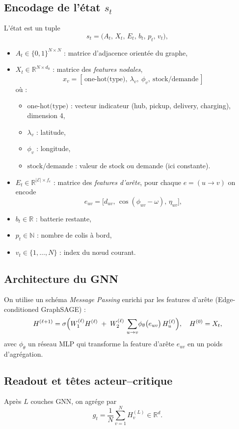 \documentclass[11pt,a4paper]{article}
\newcommand{\R}{\mathbb{R}}
\begin{document}
\subsection{Encodage de l’état \(s_t\)}
L’état est un tuple 
\[
  s_t = \bigl(A_t,\,X_t,\,E_t,\,b_t,\,p_t,\,v_t\bigr),
\]
\begin{itemize}
  \item \(A_t\in\{0,1\}^{N\times N}\) : matrice d’adjacence orientée du graphe,
  \item \(X_t\in\R^{N\times d_0}\) : matrice des \emph{features nodales},   
    \[
      x_v = [\,\text{one-hot(type)},\ \lambda_v,\ \phi_v,\ \text{stock/demande}\,]
    \]
    où :
    \begin{itemize}
      \item \(\text{one-hot(type)}\) : vecteur indicateur (hub, pickup, delivery, charging), dimension 4,
      \item \(\lambda_v\) : latitude,
      \item \(\phi_v\) : longitude,
      \item \(\text{stock/demande}\) : valeur de stock ou demande (ici constante).
    \end{itemize}
  \item \(E_t\in\R^{|\mathcal E|\times f_e}\) : matrice des \emph{features d’arête},  
    pour chaque \(e=(u\to v)\) on encode  
    \[
      e_{uv}=\bigl[d_{uv},\,\cos(\phi_{uv}-\omega),\,\eta_{uv}\bigr],
    \]
  \item \(b_t\in\R\) : batterie restante,
  \item \(p_t\in\mathbb{N}\) : nombre de colis à bord,
  \item \(v_t\in\{1,\dots,N\}\) : index du nœud courant.
\end{itemize}

\subsection{Architecture du GNN}
On utilise un schéma \emph{Message Passing} enrichi par les features d’arête (Edge-conditioned GraphSAGE) :
\[
  H^{(\ell+1)} 
  = \sigma\Bigl(
    W_1^{(\ell)}H^{(\ell)}
    \;+\;
    W_2^{(\ell)}\,\sum_{u\to v}\!\phi_\theta\bigl(e_{uv}\bigr)\,H_u^{(\ell)}
  \Bigr),
  \quad
  H^{(0)} = X_t,
\]
avec \(\phi_\theta\) un réseau MLP qui transforme la feature d’arête \(e_{uv}\) en un poids d’agrégation.  

\subsection{Readout et têtes acteur–critique}
Après \(L\) couches GNN, on agrége par 
\[
  g_t = \frac1{N}\sum_{v=1}^N H_v^{(L)} \in \R^d.
\]
\end{document}
